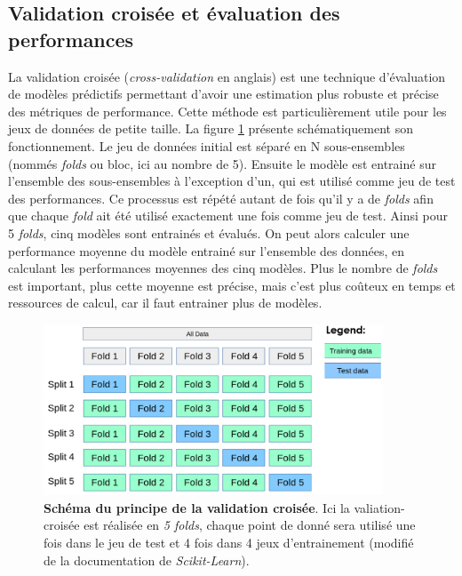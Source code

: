 \subsection{Validation croisée et évaluation des performances}
La validation croisée (\textit{cross-validation} en anglais) est une technique d'évaluation de modèles prédictifs permettant d'avoir une estimation plus robuste et précise des métriques de performance. Cette méthode est particulièrement utile pour les jeux de données de petite taille. La figure \ref{fig:cross-val} présente schématiquement son fonctionnement. Le jeu de données initial est séparé en N sous-ensembles (nommés \textit{folds} ou bloc, ici au nombre de 5). Ensuite le modèle est entrainé sur l'ensemble des sous-ensembles à l'exception d’un, qui est utilisé comme jeu de test des performances. Ce processus est répété autant de fois qu'il y a de \textit{folds} afin que chaque \textit{fold} ait été utilisé exactement une fois comme jeu de test. Ainsi pour 5 \textit{folds}, cinq modèles sont entrainés et évalués. On peut alors calculer une performance moyenne du modèle entrainé sur l'ensemble des données, en calculant les performances moyennes des cinq modèles. Plus le nombre de \textit{folds} est important, plus cette moyenne est précise, mais c'est plus coûteux en temps et ressources de calcul, car il faut entrainer plus de modèles.
\begin{figure}[!ht]
 \centering
 \includegraphics[width=0.9\textwidth]{figures/cross-val.png}
 \caption[Schéma validation-croisée]{\textbf{Schéma du principe de la validation croisée}. Ici la valiation-croisée est réalisée en \textit{5 folds}, chaque point de donné sera utilisé une fois dans le jeu de test et 4 fois dans 4 jeux d'entrainement (modifié de la documentation de \textit{Scikit-Learn}).}
 \label{fig:cross-val}
\end{figure}
